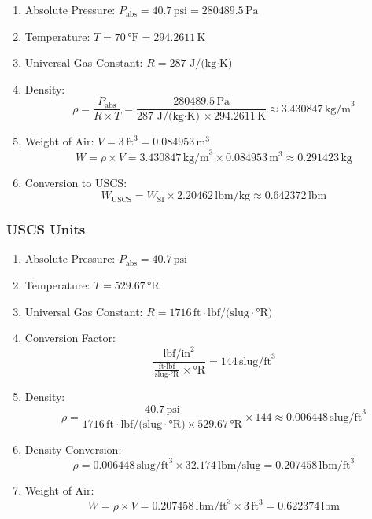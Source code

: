 \documentclass{article}
\begin{document}
\begin{enumerate}
  \item Absolute Pressure: \( P_{\text{abs}} = 40.7 \, \text{psi} = 280489.5 \, \text{Pa} \)
  \item Temperature: \( T = 70 \, \text{°F} = 294.2611 \, \text{K} \)
  \item Universal Gas Constant: \( R = 287 \, \text{J/(kg$\cdot$K)} \)
  \item Density:
    \[
    \rho = \frac{P_{\text{abs}}}{R \times T} = \frac{280489.5 \, \text{Pa}}{287 \, \text{J/(kg$\cdot$K)} \times 294.2611 \, \text{K}} \approx 3.430847 \, \text{kg/m}^3
    \]
  \item Weight of Air: \( V = 3 \, \text{ft}^3 = 0.084953 \, \text{m}^3 \)
    \[
    W = \rho \times V = 3.430847 \, \text{kg/m}^3 \times 0.084953 \, \text{m}^3 \approx 0.291423 \, \text{kg}
    \]
  \item Conversion to USCS:
    \[
    W_{\text{USCS}} = W_{\text{SI}} \times 2.20462 \, \text{lbm/kg} \approx 0.642372 \, \text{lbm}
    \]
\end{enumerate}

\subsubsection*{USCS Units}

\begin{enumerate}
  \item Absolute Pressure: \( P_{\text{abs}} = 40.7 \, \text{psi} \)
  \item Temperature: \( T = 529.67 \, \text{°R} \)
  \item Universal Gas Constant: \( R = 1716 \, \text{ft$\cdot$lbf/(slug$\cdot$°R)} \)

  \item Conversion Factor:
    \[
    \frac{\text{lbf/in}^2}{\frac{\text{ft$\cdot$lbf}}{\text{slug$\cdot$°R}} \times \text{°R}} = 144 \, \text{slug/ft}^3
    \]
  
  \item Density:
    \[
    \rho = \frac{40.7 \, \text{psi}}{1716 \, \text{ft$\cdot$lbf/(slug$\cdot$°R)} \times 529.67 \, \text{°R}} \times 144 \approx 0.006448 \, \text{slug/ft}^3
    \]
  
  \item Density Conversion:
    \[
    \rho = 0.006448 \, \text{slug/ft}^3 \times 32.174 \, \text{lbm/slug} = 0.207458 \, \text{lbm/ft}^3
    \]
  
  \item Weight of Air:
    \[
    W = \rho \times V = 0.207458 \, \text{lbm/ft}^3 \times 3 \, \text{ft}^3 = 0.622374 \, \text{lbm}
    \]
\end{enumerate}
\end{document}
